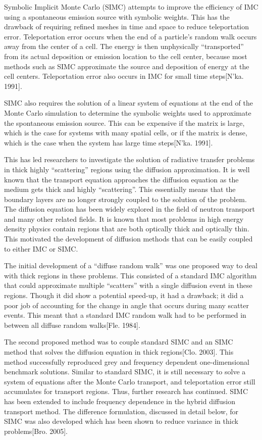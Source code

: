 	Symbolic Implicit Monte Carlo (SIMC) attempts to improve the efficiency of IMC using a spontaneous emission source with symbolic weights. This has the drawback of requiring refined meshes in time and space to reduce teleportation error. Teleportation error occurs when the end of a particle's random walk occurs away from the center of a cell. The energy is then unphysically ``transported'' from its actual deposition or emission location to the cell center, because most methods such as SIMC approximate the source and deposition of energy at the cell centers. Teleportation error also occurs in IMC for small time steps[N'ka. 1991].

	SIMC also requires the solution of a linear system of equations at the end of the Monte Carlo simulation to determine the symbolic weights used to approximate the spontaneous emission source. This can be expensive if the matrix is large, which is the case for systems with many spatial cells, or if the matrix is dense, which is the case when the system has large time steps[N'ka. 1991].

	This has led researchers to investigate the solution of radiative transfer problems in thick highly ``scattering'' regions using the diffusion approximation. It is well known that the transport equation approaches the diffusion equation as the medium gets thick and highly ``scattering''. This essentially means that the boundary layers are no longer strongly coupled to the solution of the problem. The diffusion equation has been widely explored in the field of neutron transport and many other related fields. It is known that most problems in high energy density physics contain regions that are both optically thick and optically thin. This motivated the development of diffusion methods that can be easily coupled to either IMC or SIMC. 

	The initial development of a ``diffuse random walk'' was one proposed way to deal with thick regions in these problems. This consisted of a standard IMC algorithm that could approximate multiple ``scatters'' with a single diffusion event in these regions. Though it did show a potential speed-up, it had a drawback; it did a poor job of accounting for the change in angle that occurs during many scatter events. This meant that a standard IMC random walk had to be performed in between all diffuse random walks[Fle. 1984]. 

	The second proposed method was to couple standard SIMC and an SIMC method that solves the diffusion equation in thick regions[Clo. 2003]. This method successfully reproduced grey and frequency dependent one-dimensional benchmark solutions. Similar to standard SIMC, it is still necessary to solve a system of equations after the Monte Carlo transport, and teleportation error still accumulates for transport regions.  Thus, further research has continued. SIMC has been extended to include frequency dependence in the hybrid diffusion transport method. The difference formulation, discussed in detail below, for SIMC was also developed which has been shown to reduce variance in thick problems[Bro. 2005].

